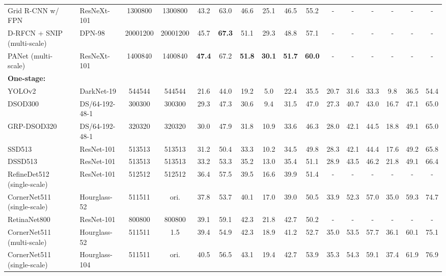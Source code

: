 \documentclass[10pt,twocolumn,letterpaper]{article}
\begin{document}
\begin{table*}[tb]
{\begin{tabular}{|l|l|cc|cccccc|cccccc|}
Grid R-CNN w/ FPN~\cite{Lu2018Grid} & ResNeXt-101 &  1300800 &  1300800 & 43.2 & 63.0 & 46.6 & 25.1 & 46.5 & 55.2 & - & - & - & - & - & - \\
D-RFCN + SNIP (multi-scale)~\cite{singh2018analysis} & DPN-98~\cite{chen2017dual} &  20001200 &  20001200 & 45.7 & \textbf{67.3} & 51.1 & 29.3 & 48.8 & 57.1 & - & - & - & - & - & - \\
PANet (multi-scale)~\cite{liu2018path} & ResNeXt-101 &  1400840 &  1400840 & \textbf{47.4} & 67.2 & \textbf{51.8} & \textbf{30.1} & \textbf{51.7} & \textbf{60.0} & - & - & - & - & - & - \\
\hline
\hline
\textbf{One-stage:} & & & & & & & & & & & & & & &\\
YOLOv2~\cite{redmon2017yolo9000} & DarkNet-19 & 544544 & 544544 & 21.6 & 44.0 & 19.2 & 5.0 & 22.4 & 35.5 & 20.7 & 31.6 & 33.3 & 9.8 & 36.5 & 54.4 \\
DSOD300~\cite{shen2017dsod} & DS/64-192-48-1 & 300300 & 300300 & 29.3 & 47.3 & 30.6 & 9.4 & 31.5 & 47.0 & 27.3 & 40.7 & 43.0 & 16.7 & 47.1 & 65.0 \\
GRP-DSOD320~\cite{shen2017learning} & DS/64-192-48-1 & 320320 & 320320 & 30.0 & 47.9 & 31.8 & 10.9 & 33.6 & 46.3 & 28.0 & 42.1 & 44.5 & 18.8 & 49.1 & 65.0 \\
SSD513~\cite{liu2016ssd} & ResNet-101 & 513513 & 513513 & 31.2 & 50.4 & 33.3 & 10.2 & 34.5 & 49.8 & 28.3 & 42.1 & 44.4 & 17.6 & 49.2 & 65.8 \\
DSSD513~\cite{fu2017dssd} & ResNet-101 & 513513 & 513513 & 33.2 & 53.3 & 35.2 & 13.0 & 35.4 & 51.1 & 28.9 & 43.5 & 46.2 & 21.8 & 49.1 & 66.4 \\
RefineDet512 (single-scale)~\cite{zhang2018single} & ResNet-101 & 512512 & 512512 & 36.4 & 57.5 & 39.5 & 16.6 & 39.9 & 51.4 & - & - & - & - & - & - \\
CornerNet511 (single-scale)~\cite{law2018cornernet} & Hourglass-52 & 511511 & ori. & 37.8 & 53.7 & 40.1 & 17.0 & 39.0 & 50.5 & 33.9 & 52.3 & 57.0 & 35.0 & 59.3 & 74.7 \\
RetinaNet800~\cite{lin2017focal} & ResNet-101 & 800800 & 800800 & 39.1 & 59.1 & 42.3 & 21.8 & 42.7 & 50.2 & - & - & - & - & - & - \\
CornerNet511 (multi-scale)~\cite{law2018cornernet} & Hourglass-52 & 511511 & 1.5 & 39.4 & 54.9 & 42.3 & 18.9 & 41.2 & 52.7 & 35.0 & 53.5 & 57.7 & 36.1 & 60.1 & 75.1 \\
CornerNet511 (single-scale)~\cite{law2018cornernet} & Hourglass-104 & 511511 & ori. & 40.5 & 56.5 & 43.1 & 19.4 & 42.7 & 53.9 & 35.3 & 54.3 & 59.1 & 37.4 & 61.9 & 76.9 \\

\end{tabular}}
\end{table*}
\end{document}
